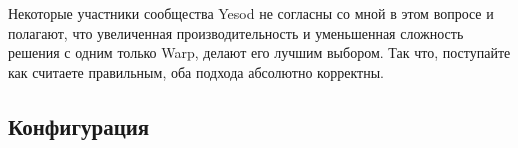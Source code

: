 
Некоторые участники сообщества Yesod не согласны со мной в этом вопросе и полагают, что увеличенная производительность и уменьшенная сложность решения с одним только Warp, делают его лучшим выбором. Так что, поступайте как считаете правильным, оба подхода абсолютно корректны.

%
\subsection{Конфигурация}
%
%
%
%
%
%
%
%
